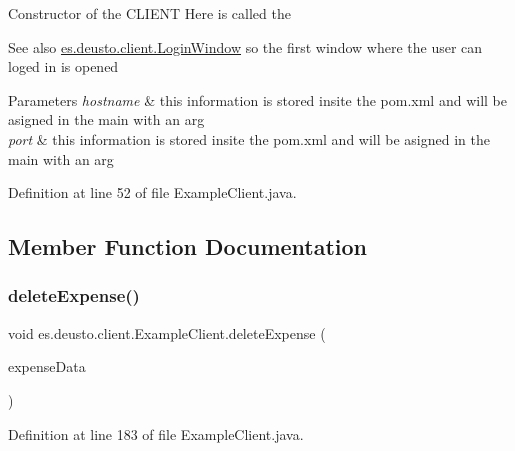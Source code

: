 Constructor of the C\+L\+I\+E\+NT Here is called the \begin{DoxySeeAlso}{See also}
\hyperlink{classes_1_1deusto_1_1client_1_1_login_window}{es.\+deusto.\+client.\+Login\+Window} so the first window where the user can loged in is opened 
\end{DoxySeeAlso}

\begin{DoxyParams}{Parameters}
{\em hostname} & this information is stored insite the pom.\+xml and will be asigned in the main with an arg \\
\hline
{\em port} & this information is stored insite the pom.\+xml and will be asigned in the main with an arg \\
\hline
\end{DoxyParams}


Definition at line 52 of file Example\+Client.\+java.



\subsection{Member Function Documentation}
\mbox{\label{classes_1_1deusto_1_1client_1_1_example_client_a206d3d1f399368f11a36b929af4337d4}} 
\subsubsection{\texorpdfstring{delete\+Expense()}{deleteExpense()}}
{\footnotesize\ttfamily void es.\+deusto.\+client.\+Example\+Client.\+delete\+Expense (\begin{DoxyParamCaption}\item[{\hyperlink{classes_1_1deusto_1_1serialization_1_1_expense_data}{Expense\+Data}}]{expense\+Data }\end{DoxyParamCaption})}



Definition at line 183 of file Example\+Client.\+java.

\mbox{\label{classes_1_1deusto_1_1client_1_1_example_client_a20bd33a8b93e804925b4a8e338413b00}} 
